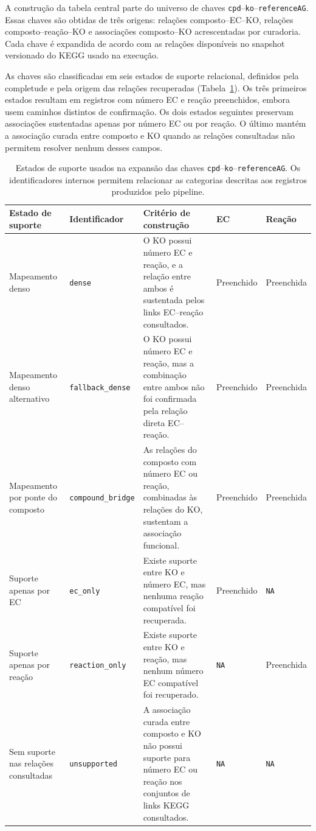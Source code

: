 A construção da tabela central parte do universo de chaves
\texttt{cpd}--\texttt{ko}--\texttt{referenceAG}. Essas chaves são obtidas de
três origens: relações composto--EC--KO, relações composto--reação--KO e
associações composto--KO acrescentadas por curadoria. Cada chave é expandida
de acordo com as relações disponíveis no snapshot versionado do KEGG usado
na execução.

As chaves são classificadas em seis estados de suporte relacional, definidos
pela completude e pela origem das relações recuperadas
(Tabela~\ref{tab:c1-support-stages}). Os três primeiros estados resultam em
registros com número EC e reação preenchidos, embora usem caminhos distintos
de confirmação. Os dois estados seguintes preservam associações sustentadas
apenas por número EC ou por reação. O último mantém a associação curada entre
composto e KO quando as relações consultadas não permitem resolver nenhum
desses campos.

\begin{table}[htbp]
\centering
\caption{Estados de suporte usados na expansão das chaves
\texttt{cpd}--\texttt{ko}--\texttt{referenceAG}. Os identificadores internos
permitem relacionar as categorias descritas aos registros produzidos
pelo pipeline.}
\label{tab:c1-support-stages}
\small
\begin{tabularx}{\textwidth}{@{}p{3.2cm}p{2.8cm}Xll@{}}
\toprule
\textbf{Estado de suporte}
& \textbf{Identificador}
& \textbf{Critério de construção}
& \textbf{EC}
& \textbf{Reação} \\
\midrule

Mapeamento denso
& \texttt{dense}
& O KO possui número EC e reação, e a relação entre ambos é sustentada pelos
links EC--reação consultados.
& Preenchido
& Preenchida \\

Mapeamento denso alternativo
& \texttt{fallback\_dense}
& O KO possui número EC e reação, mas a combinação entre ambos não foi
confirmada pela relação direta EC--reação.
& Preenchido
& Preenchida \\

Mapeamento por ponte do composto
& \texttt{compound\_bridge}
& As relações do composto com número EC ou reação, combinadas às relações do
KO, sustentam a associação funcional.
& Preenchido
& Preenchida \\

Suporte apenas por EC
& \texttt{ec\_only}
& Existe suporte entre KO e número EC, mas nenhuma reação compatível foi
recuperada.
& Preenchido
& \texttt{NA} \\

Suporte apenas por reação
& \texttt{reaction\_only}
& Existe suporte entre KO e reação, mas nenhum número EC compatível foi
recuperado.
& \texttt{NA}
& Preenchida \\

Sem suporte nas relações consultadas
& \texttt{unsupported}
& A associação curada entre composto e KO não possui suporte para número EC
ou reação nos conjuntos de links KEGG consultados.
& \texttt{NA}
& \texttt{NA} \\

\bottomrule
\end{tabularx}
\end{table}

